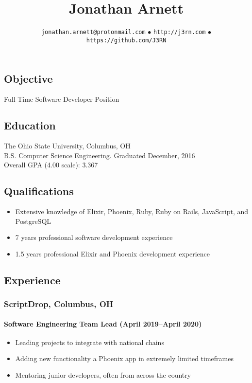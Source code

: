 \documentclass[]{article}
\begin{document}
\title{Jonathan Arnett}
\author{\texttt{jonathan.arnett@protonmail.com} $\bullet$ \texttt{http://j3rn.com} $\bullet$ \texttt{https://github.com/J3RN}}
\date{}
\maketitle

\subsection*{Objective}
Full-Time Software Developer Position

\subsection*{Education}
The Ohio State University, Columbus, OH \\
B.S. Computer Science Engineering. Graduated December, 2016 \\
Overall GPA (4.00 scale): 3.367

\subsection*{Qualifications}
\begin{itemize}
\item Extensive knowledge of Elixir, Phoenix, Ruby, Ruby on Rails, JavaScript, and PostgreSQL
\item 7 years professional software development experience
\item 1.5 years professional Elixir and Phoenix development experience
\end{itemize}

\subsection*{Experience}

\subsubsection*{ScriptDrop, Columbus, OH}
\paragraph{Software Engineering Team Lead (April 2019--April 2020)}
\begin{itemize}
\item Leading projects to integrate with national chains
\item Adding new functionality a Phoenix app in extremely limited timeframes
\item Mentoring junior developers, often from across the country
\end{itemize}
\end{document}
